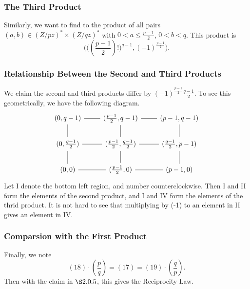 \documentclass{article}
\newcommand{\legendre}[2]{\genfrac{(}{)}{}{}{#1}{#2}}
\begin{document}
\subsubsection{The Third Product}
Similarly, we want to find to the product of all pairs $(a,b) \in (Z/pz)^{*} \times (Z/qz)^{*}$ with $0 < a \leq \frac{p-1}{2}$, $0 < b < q$. This product is
\begin{equation}
        \Big( \big((\frac{p-1}{2})!\big)^{q-1}, (-1)^{\frac{p-1}{2}}
    \Big).
\end{equation}
\subsubsection{Relationship Between the Second and Third Products}
We claim the second and third products differ by $(-1)^{\frac{p-1}{2}}{\frac{q-1}{2}}$. To see this geometrically, we have the following diagram.
\begin{equation}
    \begin{tikzcd}
{(0, q-1)} \arrow[r, no head]                                                & {(\frac{p-1}{2},q-1)} \arrow[r, no head]                                                 & {(p-1, q-1)}                              \\
{(0,\frac{q-1}{2})} \arrow[d, no head] \arrow[r, no head] \arrow[u, no head] & {(\frac{p-1}{2},\frac{q-1}{2})} \arrow[d, no head] \arrow[r, no head] \arrow[u, no head] & {(\frac{q-1}{2}, p-1)} \arrow[u, no head] \\
{(0,0)}                                                                      & {(\frac{p-1}{2},0)} \arrow[l, no head] \arrow[r, no head]                                & {(p-1,0)} \arrow[u, no head]             
\end{tikzcd}
\end{equation}
Let I denote the bottom left region, and number counterclockwise. Then I and II form the elements of the second product, and I and IV form the elements of the thrid product. It is not hard to see that multiplying by (-1) to an element in II gives an element in IV.

\subsubsection{Comparsion with the First Product}
Finally, we note
\begin{equation}
    (18)\cdot \legendre{p}{q} = (17) = (19)\cdot \legendre{q}{p}.
\end{equation}
Then with the claim in $\S2.0.5$, this gives the Reciprocity Law.
\end{document}
